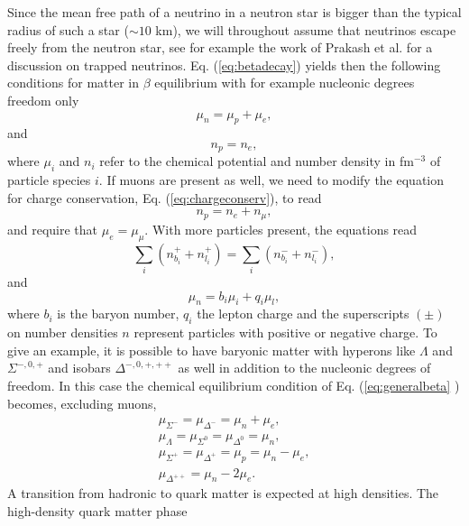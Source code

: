 \documentclass[%
oneside,                 %
final,                   %
10pt]{article}
\begin{document}
Since the mean free path of a neutrino in a neutron star is bigger
than the typical radius of such a star ($\sim 10$ km), 
we will throughout assume that neutrinos escape freely from the neutron star,
see for example  the work of Prakash et al.
for a discussion
on trapped neutrinos. Eq. (\ref{eq:betadecay}) yields then the following
conditions for matter in $\beta$ equilibrium with for example  nucleonic degrees 
freedom only
\begin{equation}
    \mu_n=\mu_p+\mu_e,
     \label{eq:npebetaequilibrium}
\end{equation}
and 
\begin{equation}
     n_p = n_e,
     \label{eq:chargeconserv}
\end{equation}
where $\mu_i$ and $n_i$ refer to the chemical potential and number density
in fm$^{-3}$ of particle species $i$. 
If muons are present as well,  we need to modify the equation for 
charge conservation, Eq. (\ref{eq:chargeconserv}), to read 
\[
     n_p = n_e+n_{\mu},
\]
and require that $\mu_e = \mu_{\mu}$.
With more particles present, the equations read
\begin{equation}
    \sum_i\left(n_{b_i}^+ +n_{l_i}^+\right) =   
    \sum_i\left(n_{b_i}^- +n_{l_i}^-\right),
    \label{eq:generalcharge}
\end{equation}
and 
\begin{equation} 
     \mu_n=b_i\mu_i+q_i\mu_l,
     \label{eq:generalbeta}
\end{equation}
where $b_i$ is the baryon number, $q_i$ the lepton charge and the superscripts 
$(\pm)$ on 
number densities $n$ represent particles with positive or negative charge.
To give an example, it is possible to have baryonic matter with hyperons like
$\Lambda$ 
and $\Sigma^{-,0,+}$ and isobars $\Delta^{-,0,+,++}$ as well in addition
to the nucleonic degrees of freedom.
In this case the chemical equilibrium condition of Eq. (\ref{eq:generalbeta}  ) 
becomes,
excluding muons,
\begin{align}
    \mu_{\Sigma^-} = \mu_{\Delta^-} = \mu_n + \mu_e , \nonumber \\ 
    \mu_{\Lambda} = \mu_{\Sigma^0} = \mu_{\Delta^0} = \mu_n , \nonumber \\
    \mu_{\Sigma^+} = \mu_{\Delta^+} = \mu_p = \mu_n - \mu_e ,\nonumber \\
    \mu_{\Delta^{++}} = \mu_n - 2 \mu_e .
    \label{eq:beta_baryonicmatter}
\end{align}
A transition from hadronic to quark matter is expected at high densities. 
The high-density quark matter phase
\end{document}
